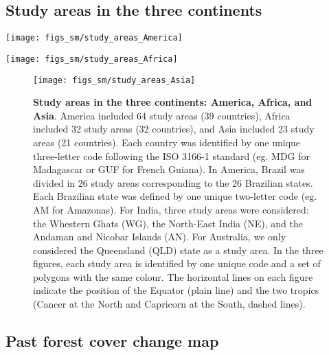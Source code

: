 \documentclass[
  12pt,
]{article}
\begin{document}
\hypertarget{study-areas-in-the-three-continents}{%
\subsection{Study areas in the three continents}\label{study-areas-in-the-three-continents}}



\begin{center}\texttt{[image: figs\_sm/study\_areas\_America]} \end{center}

\begin{center}\texttt{[image: figs\_sm/study\_areas\_Africa]} \end{center}

\begin{figure}[H]

{\centering \texttt{[image: figs\_sm/study\_areas\_Asia]} 

}

\caption{\textbf{Study areas in the three continents: America, Africa, and Asia}. America included 64 study areas (39 countries), Africa included 32 study areas (32 countries), and Asia included 23 study areas (21 countries). Each country was identified by one unique three-letter code following the ISO 3166-1 standard (eg. MDG for Madagascar or GUF for French Guiana). In America, Brazil was divided in 26 study areas corresponding to the 26 Brazilian states. Each Brazilian state was defined by one unique two-letter code (eg. AM for Amazonas). For India, three study areas were considered: the Whestern Ghats (WG), the North-East India (NE), and the Andaman and Nicobar Islands (AN). For Australia, we only considered the Queensland (QLD) state as a study area. In the three figures, each study area is identified by one unique code and a set of polygons with the same colour. The horizontal lines on each figure indicate the position of the Equator (plain line) and the two tropics (Cancer at the North and Capricorn at the South, dashed lines).}\label{fig:study-areas}
\end{figure}

\hypertarget{past-forest-cover-change-map}{%
\subsection{Past forest cover change map}\label{past-forest-cover-change-map}}
\end{document}
